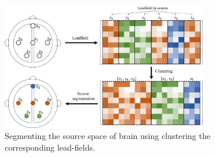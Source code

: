 \begin{figure}[!b]
\centering
\includegraphics[width=0.8\textwidth,keepaspectratio]{images/Source_Segmentation_Schematic.png} %
\centering
\caption{Segmenting the source space of brain using clustering the corresponding lead-fields.}
\label{fig:Source_Segmentation_Schematic}
\end{figure}